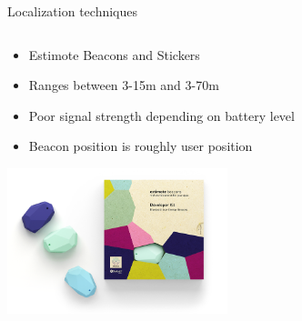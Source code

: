 \documentclass[11pt]{beamer}
\begin{document}
\begin{frame}[t]{Localization techniques}
  \begin{columns}[t]
    \begin{column}[b]{0.7\textwidth}
      \begin{itemize}
        \setlength{\itemsep}{1pt}
        \setlength{\parskip}{0pt}
        \setlength{\parsep}{0pt}
        \item Estimote Beacons and Stickers
        \item Ranges between 3-15m and 3-70m
        \item Poor signal strength depending on battery level
        \item Beacon position is roughly user position
      \end{itemize}
      \begin{center}
      \includegraphics[width=0.5\textwidth]{box_devkit}
      \end{center}
    \end{column}
    \hfill
    \begin{column}{0.3\textwidth}

\end{column}
\end{columns}
\end{frame}
\end{document}
